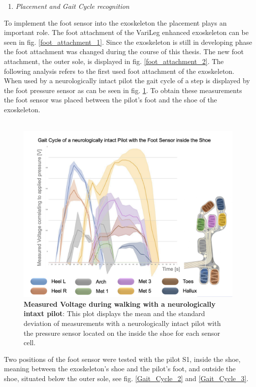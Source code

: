 \documentclass[conference,a4paper]{IEEEtran}
\begin{document}
\begin{enumerate}[\textit{3)}]
    \item{\textit{Placement and Gait Cycle recognition}}
\end{enumerate}
To implement the foot sensor into the exoskeleton the placement plays an important role. The foot attachment of the VariLeg enhanced exoskeleton can be seen in fig. \ref{foot_attachment_1}. Since the exoskeleton is still in developing phase the foot attachment was changed during the course of this thesis. The new foot attachment, the outer sole, is displayed in fig. \ref{foot_attachment_2}. The following analysis refers to the first used foot attachment of the exoskeleton. \\
When used by a neurologically intact pilot the gait cycle of a step is displayed by the foot pressure sensor as can be seen in fig. \ref{Gait_Cycle_1}. To obtain these measurements the foot sensor was placed between the pilot's foot and the shoe of the exoskeleton. \\
\\
\begin{figure}[!t]
	\centering
	\includegraphics[width=1\columnwidth]{Images/Results/Gait_Cycle_1}
	\caption{\textbf{Measured Voltage during walking with a neurologically intaxt pilot}: This plot displays the mean and the standard deviation of measurements with a neurologically intact pilot with the pressure sensor located on the inside the shoe for each sensor cell.}
	\label{Gait_Cycle_1}
\end{figure}
Two positions of the foot sensor were tested with the pilot S1, inside the shoe, meaning between the exoskeleton's shoe and the pilot's foot, and outside the shoe, situated below the outer sole, see fig. \ref{Gait_Cycle_2} and \ref{Gait_Cycle_3}.
\end{document}
